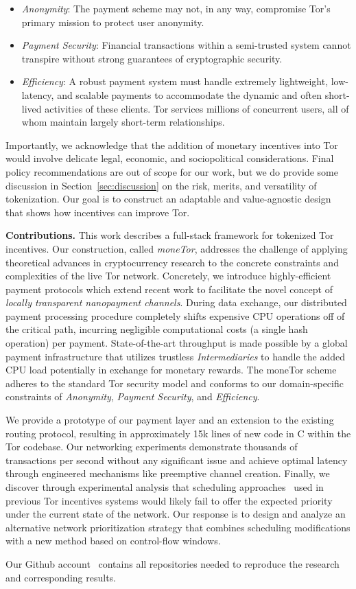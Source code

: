 \begin{itemize}
\item \emph{Anonymity}: The payment scheme may not, in any way, compromise Tor's primary mission to protect user anonymity.
\item \emph{Payment Security}: Financial transactions within a semi-trusted system cannot transpire without strong guarantees of cryptographic security.
\item \emph{Efficiency}: A robust payment system must handle extremely lightweight, low-latency, and scalable payments to accommodate the dynamic and often short-lived activities of these clients.
  Tor services millions of concurrent users, all of whom maintain largely short-term relationships.
\end{itemize}

Importantly, we acknowledge that the addition of monetary incentives into Tor would involve delicate legal, economic, and sociopolitical considerations.
Final policy recommendations are out of scope for our work, but we do provide some discussion in Section~\ref{sec:discussion} on the risk, merits, and versatility of tokenization.
Our goal is to construct an adaptable and value-agnostic design that shows how incentives can improve Tor.

\label{sec:Contributions} \medskip \noindent \textbf{Contributions.}
This work describes a full-stack framework for tokenized Tor incentives.
Our construction, called \emph{moneTor}, addresses the challenge of applying theoretical advances in cryptocurrency research to the concrete constraints and complexities of the live Tor network.
Concretely, we introduce highly-efficient payment protocols which extend recent work to facilitate the novel concept of \emph{locally transparent nanopayment channels}.
During data exchange, our distributed payment processing procedure completely shifts expensive CPU operations off of the critical path, incurring negligible computational costs (a single hash operation) per payment.
State-of-the-art throughput is made possible by a global payment infrastructure that utilizes trustless \emph{Intermediaries} to handle the added CPU load potentially in exchange for monetary rewards.
The moneTor scheme adheres to the standard Tor security model and conforms to our domain-specific constraints of \emph{Anonymity}, \emph{Payment Security}, and \emph{Efficiency}.

We provide a prototype of our payment layer and an extension to the existing routing protocol, resulting in approximately 15k lines of new code in C within the Tor codebase.
Our networking experiments demonstrate thousands of transactions per second without any significant issue and achieve optimal latency through engineered mechanisms like preemptive channel creation.
Finally, we discover through experimental analysis that scheduling approaches~\cite{dovrolis1999case, tang2010improved} used in previous Tor incentives systems would likely fail to offer the expected priority under the current state of the network.
Our response is to design and analyze an alternative network prioritization strategy that combines scheduling modifications with a new method based on control-flow windows.

Our Github account~\cite{monetor-github} contains all repositories needed to reproduce the research and corresponding results.

